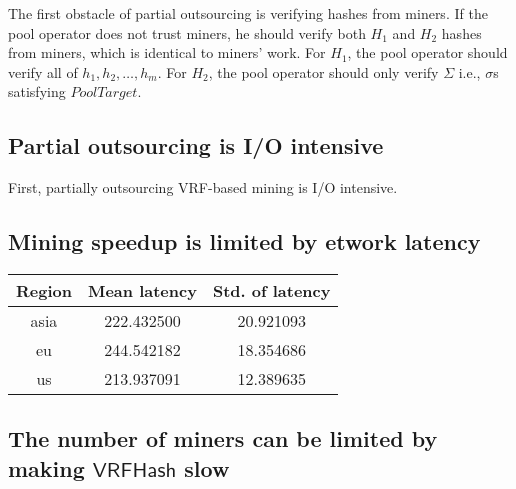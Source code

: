 The first obstacle of partial outsourcing is verifying hashes from miners.
If the pool operator does not trust miners, he should verify both $H_1$ and $H_2$ hashes from miners, which is identical to miners' work.
For $H_1$, the pool operator should verify all of $h_1, h_2, \dots, h_m$.
For $H_2$, the pool operator should only verify $\Sigma$ i.e., $\sigma$s satisfying $PoolTarget$.


\subsection{Partial outsourcing is I/O intensive}

First, partially outsourcing VRF-based mining is I/O intensive.


\subsection{Mining speedup is limited by etwork latency}

\begin{table}
    \centering
    \begin{tabular}{|c|c|c|}
        \hline
        Region     & Mean latency & Std. of latency \\\hline
        asia   & 222.432500    & 20.921093    \\\hline
        eu     & 244.542182    & 18.354686    \\\hline
        us     & 213.937091    & 12.389635    \\\hline
    \end{tabular}
\end{table}





\subsection{The number of miners can be limited by making $\mathsf{VRFHash}$ slow}